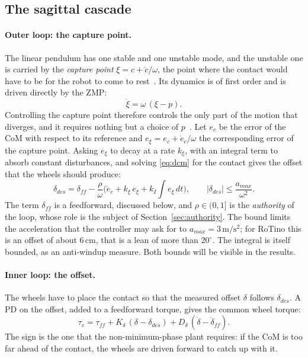 \documentclass[11pt,a4paper]{article}
\newcommand{\unit}[1]{\,\mathrm{#1}}
\newcommand{\tc}{\tau_c}
\begin{document}
\subsection{The sagittal cascade}

\paragraph{Outer loop: the capture point.} The linear pendulum has one stable and one unstable mode, and the
unstable one is carried by the \emph{capture point} $\xi=c+\dot c/\omega$, the point where the contact would have
to be for the robot to come to rest~\cite{pratt2006}. Its dynamics is of first order and is driven directly by
the ZMP:
\begin{equation}
  \dot\xi=\omega\,(\xi-p).
  \label{eq:dcm}
\end{equation}
Controlling the capture point therefore controls the only part of the motion that diverges, and it requires nothing
but a choice of $p$~\cite{englsberger2011}. Let $e_c$ be the error of the CoM with respect to its reference and
$e_\xi=e_c+\dot e_c/\omega$ the corresponding error of the capture point. Asking $e_\xi$ to decay at a rate $k_\xi$,
with an integral term to absorb constant disturbances, and solving \eqref{eq:dcm} for the contact gives the offset
that the wheels should produce:
\begin{equation}
  \delta_{des}=\delta_{ff}-\frac{\rho}{\omega}\Big(\dot e_c+k_\xi\,e_\xi+k_I\!\int\! e_\xi\,dt\Big),
  \qquad |\delta_{des}|\le\frac{a_{max}}{\omega^2}.
  \label{eq:outer}
\end{equation}
The term $\delta_{ff}$ is a feedforward, discussed below, and $\rho\in(0,1]$ is the \emph{authority} of the loop,
whose role is the subject of Section~\ref{sec:authority}. The bound limits the acceleration that the controller may
ask for to $a_{max}=3\unit{m/s^2}$; for RoTino this is an offset of about 6\,cm, that is a lean of more than
$20^\circ$. The integral is itself bounded, as an anti-windup measure. Both bounds will be visible in the results.

\paragraph{Inner loop: the offset.} The wheels have to place the contact so that the measured offset $\delta$
follows $\delta_{des}$. A PD on the offset, added to a feedforward torque, gives the common wheel torque:
\begin{equation}
  \tc=\tau_{ff}+K_\delta\,(\delta-\delta_{des})+D_\delta\,(\dot\delta-\dot\delta_{ff}).
  \label{eq:inner}
\end{equation}
The sign is the one that the non-minimum-phase plant requires: if the CoM is too far ahead of the contact, the
wheels are driven forward to catch up with it.
\end{document}
